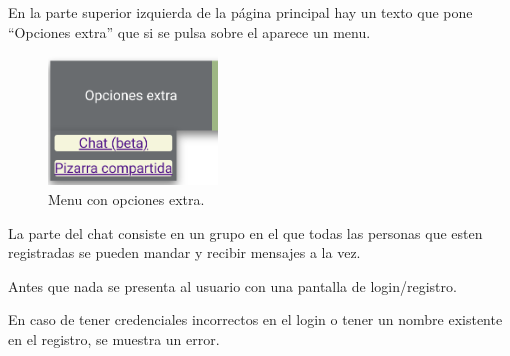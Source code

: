 \documentclass{article}
\begin{document}
En la parte superior izquierda de la página principal hay un texto que pone ``Opciones extra'' que si se pulsa sobre el aparece un menu.

\begin{figure}[H]
    \centering
    \includegraphics[width=0.4\textwidth]{images/extra.png}
    \caption{Menu con opciones extra.}
\end{figure}

La parte del chat consiste en un grupo en el que todas las personas que esten registradas se pueden mandar y recibir mensajes a la vez.

Antes que nada se presenta al usuario con una pantalla de login/registro.

En caso de tener credenciales incorrectos en el login o tener un nombre existente en el registro, se muestra un error.
\end{document}
